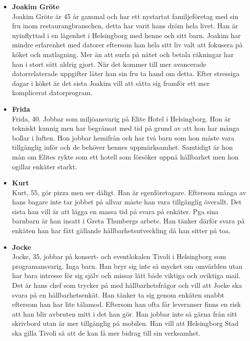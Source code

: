 \documentclass{article}
\begin{document}
\begin{itemize}
        \begin{itemize}
            \item [] \textbf{Joakim Gröte}
            \\
            Joakim Gröte är 45 år gammal och har ett nystartat familjeföretag med sin fru inom restaurangbranschen, detta har varit hans dröm hela livet. Han är  nyinflyttad i en lägenhet i Helsingborg med henne och sitt barn. Joakim har mindre erfarenhet med datorer eftersom han hela sitt liv valt att fokusera på köket och matlagning. Mer än att surfa på nätet och betala räkningar har han i stort sätt aldrig gjort. När det kommer till mer avancerade datorrelaterade uppgifter låter han sin fru ta hand om detta. Efter stressiga dagar i köket är det sista Joakim vill att sätta sig framför ett mer komplicerat datorprogram. 
            
             \item [] \textbf{Frida}
            \\
            Frida, 40. Jobbar som miljöansvarig på Elite Hotel i Helsingborg. Hon är tekniskt kunnig men har begränsat med tid på grund av att hon har många bollar i luften. Hon jobbar hemifrån och har två barn som hon måste vara tillgänglig inför och de behöver hennes uppmärksamhet. Samtidigt är hon mån om Elites rykte som ett hotell som försöker uppnå hållbarhet men hon ogillar enkäter starkt.
            
             \item [] \textbf{Kurt}
            \\
            Kurt, 55, gör pizza men ser dåligt. Han är egenföretagare. Eftersom många av hans bagare inte tar jobbet på allvar måste han vara tillgänglig överallt. Det sista han vill är att lägga en massa tid på svara på enkäter. Pga sina barnbarn är han insatt i Greta Thunbergs arbete. Han tänker därför svara på enkäten han har fått gällande hållbarhetsutveckling då han sitter på toa.
            
            \item [] \textbf{Jocke}
            \\
            Jocke, 35, jobbar på konsert- och eventlokalen Tivoli i Helsingborg som programansvarig. Inga barn. Han bryr sig inte så mycket om omvärlden utan har bara intresse för sig själv och missar lätt både viktiga och oviktiga mail. Det är hans chef som trycker på med hållbarhetsfrågor och vill att Jocke ska svara på en hållbarhetsenkät. Han tänker ta sig genom enkäten snabbt eftersom han har lite tålamod. Eftersom han ofta får leveranser finns en risk att han blir avbruten mitt i det han gör. Han jobbar inte så gärna från sitt skrivbord utan är mer tillgänglig på mobilen. Han vill att Helsingborg Stad ska gilla Tivoli så att de kan få mer bidrag till sin verksamhet. 
            

\end{itemize}
\end{itemize}
\end{document}
